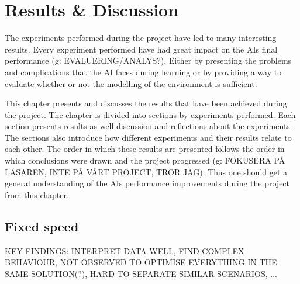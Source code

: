 

\chapter{Results \& Discussion}
The experiments performed during the project have led to many interesting results. Every experiment performed have had great impact on the AIs final performance (g: EVALUERING/ANALYS?). Either by presenting the problems and complications that the AI faces during learning or by providing a way to evaluate whether or not the modelling of the environment is sufficient.

This chapter presents and discusses the results that have been achieved during the project. The chapter is divided into sections by experiments performed. Each section presents results as well discussion and reflections about the experiments. The sections also introduce how different experiments and their results relate to each other. The order in which these results are presented follows the order in which conclusions were drawn and the project progressed (g: FOKUSERA PÅ LÄSAREN, INTE PÅ VÅRT PROJECT, TROR JAG). Thus one should get a general understanding of the AIs performance improvements during the project from this chapter.


\section{Fixed speed}

KEY FINDINGS: INTERPRET DATA WELL, FIND COMPLEX BEHAVIOUR, NOT OBSERVED TO OPTIMISE EVERYTHING IN THE SAME SOLUTION(?), HARD TO SEPARATE SIMILAR SCENARIOS, ...

